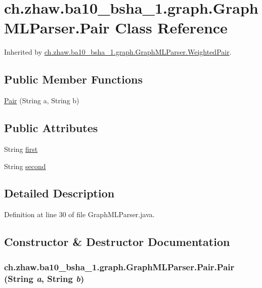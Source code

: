 \hypertarget{classch_1_1zhaw_1_1ba10__bsha__1_1_1graph_1_1GraphMLParser_1_1Pair}{
\section{ch.zhaw.ba10\_\-bsha\_\-1.graph.GraphMLParser.Pair Class Reference}
\label{classch_1_1zhaw_1_1ba10__bsha__1_1_1graph_1_1GraphMLParser_1_1Pair}
}


Inherited by \hyperlink{classch_1_1zhaw_1_1ba10__bsha__1_1_1graph_1_1GraphMLParser_1_1WeightedPair}{ch.zhaw.ba10\_\-bsha\_\-1.graph.GraphMLParser.WeightedPair}.\subsection*{Public Member Functions}
\begin{DoxyCompactItemize}
\item 
\hyperlink{classch_1_1zhaw_1_1ba10__bsha__1_1_1graph_1_1GraphMLParser_1_1Pair_a61aee729d7d7343bb59ea3bad5be7a8e}{Pair} (String a, String b)
\end{DoxyCompactItemize}
\subsection*{Public Attributes}
\begin{DoxyCompactItemize}
\item 
String \hyperlink{classch_1_1zhaw_1_1ba10__bsha__1_1_1graph_1_1GraphMLParser_1_1Pair_ae033c9d8c8a345f5a48e5aebe8fba2ea}{first}
\item 
String \hyperlink{classch_1_1zhaw_1_1ba10__bsha__1_1_1graph_1_1GraphMLParser_1_1Pair_af61783aea3533f7e3821afc23dd3f00f}{second}
\end{DoxyCompactItemize}


\subsection{Detailed Description}


Definition at line 30 of file GraphMLParser.java.

\subsection{Constructor \& Destructor Documentation}
\hypertarget{classch_1_1zhaw_1_1ba10__bsha__1_1_1graph_1_1GraphMLParser_1_1Pair_a61aee729d7d7343bb59ea3bad5be7a8e}{
\subsubsection[{Pair}]{\setlength{\rightskip}{0pt plus 5cm}ch.zhaw.ba10\_\-bsha\_\-1.graph.GraphMLParser.Pair.Pair (String {\em a}, \/  String {\em b})}}
\label{classch_1_1zhaw_1_1ba10__bsha__1_1_1graph_1_1GraphMLParser_1_1Pair_a61aee729d7d7343bb59ea3bad5be7a8e}


